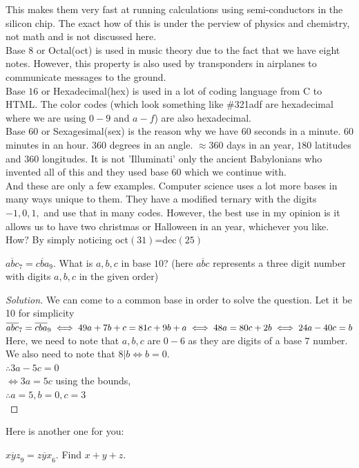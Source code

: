 This makes them very fast at running calculations using semi-conductors in the silicon chip. The exact how of this is under the perview of physics and chemistry, not math and is not discussed here.\\
Base $8$ or Octal(oct) is used in music theory due to the fact that we have eight notes. However, this property is also used by transponders in airplanes to communicate messages to the ground.\\
Base $16$ or Hexadecimal(hex) is used in a lot of coding language from C to HTML. The color codes (which look something like \#321adf are hexadecimal where we are using $0-9$ and $a-f$) are also hexadecimal.\\
Base $60$ or Sexagesimal(sex) is the reason why we have $60$ seconds in a minute. $60$ minutes in an hour. $360$ degrees in an angle. $\approx 360$ days in an year, $180$ latitudes and $360$ longitudes. It is not 'Illuminati' only the ancient Babylonians who invented all of this and they used base $60$ which we continue with.\\
And these are only a few examples. Computer science uses a lot more bases in many ways unique to them. They have a modified ternary with the digits $-1, 0, 1,$ and use that in many codes. However, the best use in my opinion is it allows us to have two christmas or Halloween in an year, whichever you like. How? By simply noticing oct$(31)$=dec$(25)$\\
\begin{example}
$\overline{abc}_7 = \overline{cba}_9$. What is $a,b,c$ in base $10$? (here $\overline{abc}$ represents a three digit number with digits $a,b,c$ in the given order)
\end{example}
\begin{proof}
    [Solution]
    We can come to a common base in order to solve the question. Let it be 10 for simplicity\\
    $\overline{abc}_7 = \overline{cba}_9\\
    \iff 49a+7b+c=81c+9b+a\\
    \iff 48a=80c+2b\\
    \iff 24a-40c=b$\\
    Here, we need to note that $a,b,c$ are $0-6$ as they are digits of a base $7$ number. We also need to note that $8|b \iff b=0$.\\
    $\therefore 3a-5c=0$\\
    $\iff 3a=5c$ using the bounds,\\
    $\therefore a=5, b=0, c=3$\\
\end{proof}
Here is another one for you:
\begin{example}
$\overline{xyz}_9 =\overline{zyx}_6$. Find $x + y + z$.
\end{example}
